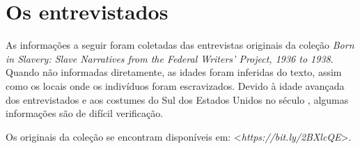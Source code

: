 \chapter{Os entrevistados}

As informações a seguir foram coletadas das entrevistas originais da
coleção \emph{Born in Slavery: Slave Narratives from the Federal
Writers' Project, 1936 to 1938}. Quando não informadas diretamente, as
idades foram inferidas do texto, assim como os locais onde os indivíduos
foram escravizados. Devido à idade avançada dos entrevistados e aos
costumes do Sul dos Estados Unidos no século , algumas informações
são de difícil verificação.

Os originais da coleção se encontram disponíveis em:
\textless{}\emph{https://bit.ly/2BXlcQE}\textgreater{}.

